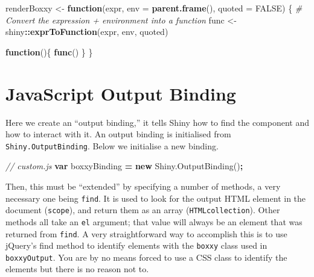 \documentclass[
]{krantz}
\makeatletter
\newenvironment{Shaded}{\begin{snugshade}}{\end{snugshade}}
\newcommand{\AttributeTok}[1]{\textcolor[rgb]{0.61,0.61,0.61}{#1}}
\newcommand{\CommentTok}[1]{\textcolor[rgb]{0.37,0.37,0.37}{\textit{#1}}}
\newcommand{\ControlFlowTok}[1]{\textcolor[rgb]{0.27,0.27,0.27}{\textbf{#1}}}
\newcommand{\DataTypeTok}[1]{\textcolor[rgb]{0.27,0.27,0.27}{#1}}
\newcommand{\KeywordTok}[1]{\textcolor[rgb]{0.27,0.27,0.27}{\textbf{#1}}}
\newcommand{\NormalTok}[1]{#1}
\newcommand{\OperatorTok}[1]{\textcolor[rgb]{0.43,0.43,0.43}{\textbf{#1}}}
\newcommand{\OtherTok}[1]{\textcolor[rgb]{0.37,0.37,0.37}{#1}}
\newcommand{\StringTok}[1]{\textcolor[rgb]{0.5,0.5,0.5}{#1}}
\newcommand{\VariableTok}[1]{\textcolor[rgb]{0,0,0}{#1}}
\newenvironment{kframe}{%
\medskip{}
\setlength{\fboxsep}{.8em}
 \def\at@end@of@kframe{}%
 \ifinner\ifhmode%
  \def\at@end@of@kframe{\end{minipage}}%
  \begin{minipage}{\columnwidth}%
 \fi\fi%
 \def\FrameCommand##1{\hskip\@totalleftmargin \hskip-\fboxsep
 \colorbox{shadecolor}{##1}\hskip-\fboxsep
     \hskip-\linewidth \hskip-\@totalleftmargin \hskip\columnwidth}%
 \MakeFramed {\advance\hsize-\width
   \@totalleftmargin\z@ \linewidth\hsize
   \@setminipage}}%
 {\par\unskip\endMakeFramed%
 \at@end@of@kframe}
\renewenvironment{Shaded}{\begin{kframe}}{\end{kframe}}
\makeatother
\begin{document}
\begin{Shaded}
\begin{Highlighting}[]
\NormalTok{renderBoxxy <{-}}\StringTok{ }\ControlFlowTok{function}\NormalTok{(expr, }\DataTypeTok{env =} \KeywordTok{parent.frame}\NormalTok{(), }
  \DataTypeTok{quoted =} \OtherTok{FALSE}\NormalTok{) \{}
  \CommentTok{\# Convert the expression + environment into a function}
\NormalTok{  func <{-}}\StringTok{ }\NormalTok{shiny}\OperatorTok{::}\KeywordTok{exprToFunction}\NormalTok{(expr, env, quoted)}

  \ControlFlowTok{function}\NormalTok{()\{}
    \KeywordTok{func}\NormalTok{()}
\NormalTok{  \}}
\NormalTok{\}}
\end{Highlighting}
\end{Shaded}

\hypertarget{shiny-output-binding}{%
\section{JavaScript Output Binding}\label{shiny-output-binding}}

Here we create an ``output binding,'' it tells Shiny how to find the component and how to interact with it. An output binding is initialised from \texttt{Shiny.OutputBinding}. Below we initialise a new binding.

\begin{Shaded}
\begin{Highlighting}[]
\CommentTok{// custom.js}
\KeywordTok{var}\NormalTok{ boxxyBinding }\OperatorTok{=} \KeywordTok{new} \VariableTok{Shiny}\NormalTok{.}\AttributeTok{OutputBinding}\NormalTok{()}\OperatorTok{;}
\end{Highlighting}
\end{Shaded}

Then, this must be ``extended'' by specifying a number of methods, a very necessary one being \texttt{find}. It is used to look for the output HTML element in the document (\texttt{scope}), and return them as an array (\texttt{HTMLcollection}). Other methods all take an \texttt{el} argument; that value will always be an element that was returned from \texttt{find}. A very straightforward way to accomplish this is to use jQuery's find method to identify elements with the \texttt{boxxy} class used in \texttt{boxxyOutput}. You are by no means forced to use a CSS class to identify the elements but there is no reason not to.
\end{document}
